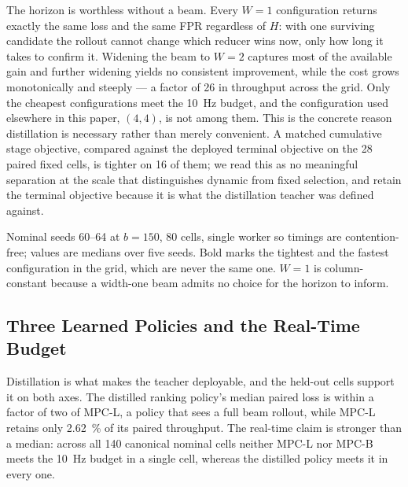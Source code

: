 \documentclass[letterpaper, 10 pt, conference]{ieeeconf}  %
\newcommand{\tablenote}[1]{%
  \par\vspace{3pt}%
  \begin{minipage}{\linewidth}\footnotesize\raggedright #1\end{minipage}%
}
\begin{document}
The horizon is worthless without a beam.
Every $W{=}1$ configuration returns exactly the same loss and the same FPR regardless of $H$: with one surviving candidate the rollout cannot change which reducer wins now, only how long it takes to confirm it.
Widening the beam to $W{=}2$ captures most of the available gain and further widening yields no consistent improvement, while the cost grows monotonically and steeply --- a factor of 26 in throughput across the grid.
Only the cheapest configurations meet the \SI{10}{\hertz} budget, and the configuration used elsewhere in this paper, $(4{,}4)$, is not among them.
This is the concrete reason distillation is necessary rather than merely convenient.
A matched cumulative stage objective, compared against the deployed terminal objective on the 28 paired fixed cells, is tighter on 16 of them; we read this as no meaningful separation at the scale that distinguishes dynamic from fixed selection, and retain the terminal objective because it is what the distillation teacher was defined against.

\begin{table}[t]
  \centering
  \caption{Cost of the predictive search: horizon and beam width}
  \label{tab:search-cost}
  \small
  {\setlength{\tabcolsep}{2.5pt}}
  \tablenote{
    Nominal seeds 60--64 at $b=150$, 80 cells, single worker so
        timings are contention-free; values are medians over five seeds. Bold
        marks the tightest and the fastest configuration in the grid, which are
        never the same one.
        $W{=}1$ is column-constant because a width-one beam admits no choice for
        the horizon to inform.
  }
\end{table}

\subsection{Three Learned Policies and the Real-Time Budget}
\label{sec:eval-realtime}
Distillation is what makes the teacher deployable, and the held-out cells support it on both axes.
The distilled ranking policy's median paired loss is within a factor of two of MPC-L, a policy that sees a full beam rollout, while MPC-L retains only \SI{2.62}{\percent} of its paired throughput.
The real-time claim is stronger than a median: across all 140 canonical nominal cells neither MPC-L nor MPC-B meets the \SI{10}{\hertz} budget in a single cell, whereas the distilled policy meets it in every one.
\end{document}
